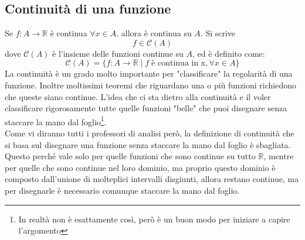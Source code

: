 \subsection{Continuità di una funzione}
Se $f:A \to \mathbb{R}$ è continua $\forall x \in A$. allora è continua su $A$. Si scrive
\begin{equation*}
    f \in \mathcal{C} (A)
\end{equation*}
dove $\mathcal{C}(A)$ è l'insieme delle funzioni continue su $A$, ed è definito come:
\begin{equation*}
    \mathcal{C}(A) = \{ f:A\to \mathbb{R}\; |\; f\; \text{è continua in x}, \forall x \in A \}
\end{equation*}
La continuità è un grado molto importante per "classificare" la regolarità di una funzione. Inoltre moltissimi teoremi che riguardano una o più funzioni richiedono che queste siano continue. L'idea che ci sta dietro alla continuità e il voler classificare rigorosamente tutte quelle funzioni "belle" che puoi disegnare senza staccare la mano dal foglio\footnote{In realtà non è esattamente così, però è un buon modo per iniziare a capire l'argomento}.\\
Come vi diranno tutti i professori di analisi però, la definizione di continuità che si basa sul disegnare una funzione senza staccare la mano dal foglio è sbagliata. Questo perché vale solo per quelle funzioni che sono continue su tutto $\mathbb{R}$, mentre per quelle che sono continue nel loro dominio, ma proprio questo dominio è composto dall'unione di molteplici intervalli disgiunti, allora restano continue, ma per disegnarle è necessario comunque staccare la mano dal foglio.



